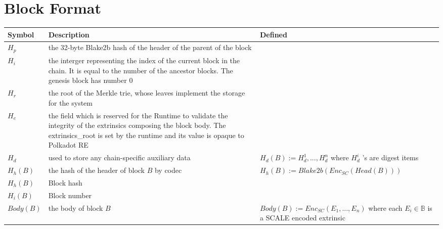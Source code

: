 \documentclass[11pt,a4paper]{article}
\begin{document}
\section*{Block Format}
\begin{center}
 \begin{tabulary}{1.5\textwidth}{LLL}
  \textbf{Symbol} & \textbf{Description} & \textbf{Defined} \\
  \hline
\(H_p\) &the 32-byte Blake2b hash of the header of the parent of the block&\\
\(H_i\) &the interger representing the index of the current block in the chain. It is equal to the number of the ancestor blocks. The genesis block has number 0&\\
\(H_r\) &the root of the Merkle trie, whose leaves implement the storage for the system&\\
\(H_e\) &the field which is reserved for the Runtime to validate the integrity of the extrinsics composing the block body. The extrinsics\_root is set by the runtime and its value is opaque to Polkadot RE&\\
\(H_d\) &used to store any chain-specific auxiliary data& \(H_d(B):=H^1_d,...,H^n_d\) where \(H^i_d\) 's are digest items\\
\(H_h(B)\) &the hash of the header of block \(B\) by codec& \(H_h(B):=Blake2b(Enc_{SC}(Head(B)))\) \\
\(H_h(B)\) &Block hash&\\
\(H_i(B)\) &Block number&\\
\(Body(B)\) &the body of block \(B\) & \(Body(B):=Enc_{SC}(E_1,...,E_n)\) where each \(E_i \in \mathbb B\) is a SCALE encoded extrinsic\\
 \end{tabulary}
\end{center}
\end{document}

